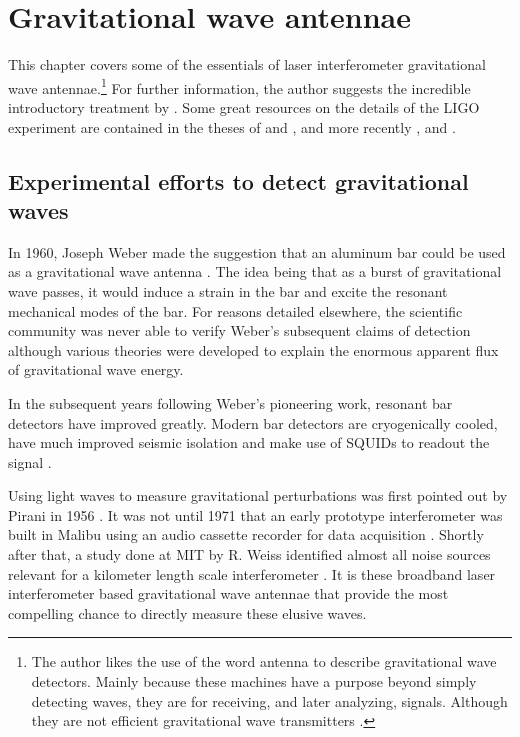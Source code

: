 \chapter{Gravitational wave antennae}
\label{ch:ifo}
This chapter covers some of the essentials of laser interferometer gravitational wave antennae.\footnote{The author likes the use of the word antenna to describe gravitational wave detectors. %
Mainly because these machines have a purpose beyond simply detecting waves, they are for receiving, and later analyzing, signals. %
Although they are not efficient gravitational wave transmitters \cite{gwconductor}.} For further information, the author suggests the incredible introductory treatment by \citet{saulson1994fundamentals}. %
Some great resources on the details of the LIGO experiment are contained in the theses of \citet{ranathesis} and \citet{stefanthesis}, and more recently \citet{FrickeThesis}, \citet{dooleythesis} and \citet{kisselthesis}.
\section{Experimental efforts to detect gravitational waves}
In 1960, Joseph Weber made the suggestion that an aluminum bar could be used as a gravitational wave antenna \cite{bar1}. %
The idea being that as a burst of gravitational wave passes, it would induce a strain in the bar and excite the resonant mechanical modes of the bar. %
For reasons detailed elsewhere\cite{bar2,bar3}, the scientific community was never able to verify Weber's subsequent claims of detection\cite{bar4} although various theories\cite{bar5,bar6} were developed to explain the enormous apparent flux of gravitational wave energy.

In the subsequent years following Weber's pioneering work, resonant bar detectors have improved greatly. %
Modern bar detectors are cryogenically cooled, have much improved seismic isolation and make use of SQUIDs to readout the signal \cite{bar7}.

Using light waves to measure gravitational perturbations was first pointed out by Pirani in 1956 \cite{ifo1}. %
It was not until 1971 that an early prototype interferometer was built in Malibu using an audio cassette recorder for data acquisition \cite{ifo2}. %
Shortly after that, a study done at MIT by R. %
Weiss identified almost all noise sources relevant for a kilometer length scale interferometer \cite{ifo3}. %
It is these broadband laser interferometer based gravitational wave antennae that provide the most compelling chance to directly measure these elusive waves.

